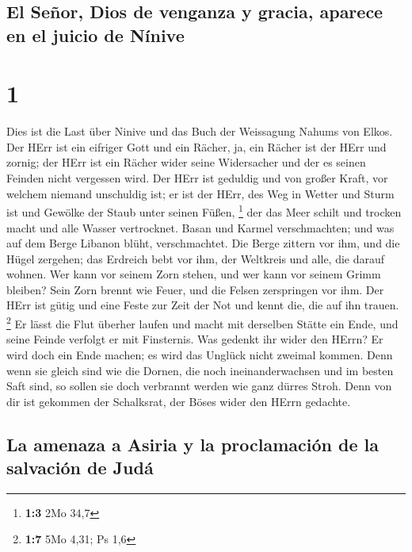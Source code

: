 \hypertarget{el-seuxf1or-dios-de-venganza-y-gracia-aparece-en-el-juicio-de-nuxednive}{%
\subsection{El Señor, Dios de venganza y gracia, aparece en el juicio de
Nínive}\label{el-seuxf1or-dios-de-venganza-y-gracia-aparece-en-el-juicio-de-nuxednive}}

\hypertarget{section}{%
\section{1}\label{section}}

 Dies ist die Last über Ninive und das Buch der Weissagung
Nahums von Elkos.  Der HErr ist ein eifriger Gott und ein
Rächer, ja, ein Rächer ist der HErr und zornig; der HErr ist ein Rächer
wider seine Widersacher und der es seinen Feinden nicht vergessen wird.
 Der HErr ist geduldig und von großer Kraft, vor welchem
niemand unschuldig ist; er ist der HErr, des Weg in Wetter und Sturm ist
und Gewölke der Staub unter seinen Füßen, \footnote{\textbf{1:3} 2Mo
  34,7}  der das Meer schilt und trocken macht und alle
Wasser vertrocknet. Basan und Karmel verschmachten; und was auf dem
Berge Libanon blüht, verschmachtet.  Die Berge zittern vor
ihm, und die Hügel zergehen; das Erdreich bebt vor ihm, der Weltkreis
und alle, die darauf wohnen.  Wer kann vor seinem Zorn
stehen, und wer kann vor seinem Grimm bleiben? Sein Zorn brennt wie
Feuer, und die Felsen zerspringen vor ihm.  Der HErr ist
gütig und eine Feste zur Zeit der Not und kennt die, die auf ihn trauen.
\footnote{\textbf{1:7} 5Mo 4,31; Ps 1,6}  Er lässt die
Flut überher laufen und macht mit derselben Stätte ein Ende, und seine
Feinde verfolgt er mit Finsternis.  Was gedenkt ihr wider
den HErrn? Er wird doch ein Ende machen; es wird das Unglück nicht
zweimal kommen.  Denn wenn sie gleich sind wie die
Dornen, die noch ineinanderwachsen und im besten Saft sind, so sollen
sie doch verbrannt werden wie ganz dürres Stroh.  Denn
von dir ist gekommen der Schalksrat, der Böses wider den HErrn gedachte.

\hypertarget{la-amenaza-a-asiria-y-la-proclamaciuxf3n-de-la-salvaciuxf3n-de-juduxe1}{%
\subsection{La amenaza a Asiria y la proclamación de la salvación de
Judá}\label{la-amenaza-a-asiria-y-la-proclamaciuxf3n-de-la-salvaciuxf3n-de-juduxe1}}

